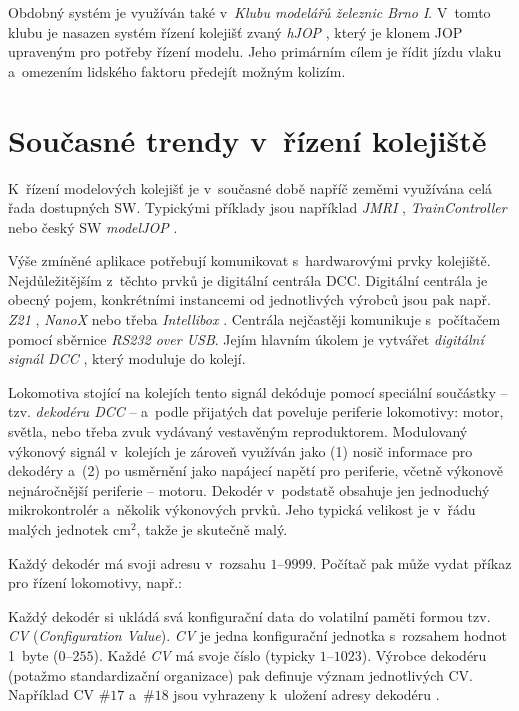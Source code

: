 Obdobný systém je využíván také v~\textit{Klubu modelářů železnic Brno I}.
V~tomto klubu je nasazen systém řízení kolejišť zvaný \textit{hJOP}
\cite{hjop:web}, který je klonem \gls{JOP} upraveným pro potřeby řízení modelu. Jeho
primárním cílem je řídit jízdu vlaku a~omezením lidského faktoru předejít
možným kolizím.

\section{Současné trendy v~řízení kolejiště}
\label{sec:trendy}

K~řízení modelových kolejišť je v~současné době napříč zeměmi využívána celá
řada dostupných SW. Typickými příklady jsou například \textit{JMRI}
\cite{jmri:web}, \textit{TrainController} \cite{traincontroller:web}
nebo český SW \textit{modelJOP} \cite{modeljop:web}.

Výše zmíněné aplikace potřebují komunikovat s~hardwarovými prvky kolejiště.
Nejdůležitějším z~těchto prvků je digitální centrála \gls{DCC}. Digitální centrála je
obecný pojem, konkrétními instancemi od jednotlivých výrobců jsou pak např.
\textit{Z21} \cite{z21:web}, \textit{NanoX} \cite{nanox:web} nebo třeba
\textit{Intellibox} \cite{intellibox:web}. Centrála nejčastěji komunikuje
s~počítačem pomocí sběrnice \textit{RS232 over USB}. Jejím hlavním úkolem je
vytvářet \textit{digitální signál \gls{DCC}} \cite{nmra:dcc:ele}, který moduluje do
kolejí.

Lokomotiva stojící na kolejích tento signál dekóduje pomocí spe\-ciál\-ní
součástky -- tzv. \textit{dekodéru \gls{DCC}} -- a~podle přijatých dat poveluje
periferie lokomotivy: motor, světla, nebo třeba zvuk vydávaný vestavěným
reproduktorem. Modulovaný výkonový signál v~kolejích je zároveň využíván jako
(1) nosič informace pro dekodéry a~(2) po usměrnění jako napájecí napětí pro
periferie, včetně výkonově nejnáročnější periferie -- motoru. Dekodér
v~podstatě obsahuje jen jednoduchý mikrokontrolér a~několik výkonových prvků.
Jeho typická velikost je v~řádu malých jednotek cm$^2$, takže je skutečně malý.

Každý dekodér má svoji adresu v~rozsahu $1$--$9999$. Počítač pak může vydat příkaz
pro řízení lokomotivy, např.: \textit{}

Každý dekodér si ukládá svá konfigurační data do volatilní paměti formou tzv.
\textit{\gls{CV}} (\textit{Configuration Value}). \textit{\gls{CV}} je jedna konfigurační
jednotka s~rozsahem hodnot 1~byte ($0$--$255$). Každé \textit{\gls{CV}} má svoje číslo
(typicky $1$--$1023$). Výrobce dekodéru (potažmo standardizační organizace) pak
definuje význam jednotlivých \gls{CV}. Například \gls{CV} $\#17$ a~$\#18$ jsou vyhrazeny
k~uložení adresy dekodéru \cite{zimo:cvs}.

